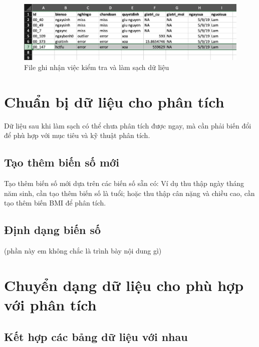 \documentclass[]{tufte-book}
\begin{document}
\begin{figure}

{\centering \includegraphics[width=0.8\linewidth]{figures/02_04} 

}

\caption[File ghi nhận việc kiểm tra và làm sạch dữ liệu]{File ghi nhận việc kiểm tra và làm sạch dữ liệu}\label{fig:documentclean}
\end{figure}

\hypertarget{chun-bi-d-liu-cho-phan-tich}{%
\chapter{Chuẩn bị dữ liệu cho phân tích}\label{chun-bi-d-liu-cho-phan-tich}}

Dữ liệu sau khi làm sạch có thể chưa phân tích được ngay, mà cần phải biến đổi để phù hợp với mục tiêu và kỹ thuật phân tích.

\hypertarget{tao-them-bin-s-mi}{%
\section{Tạo thêm biến số mới}\label{tao-them-bin-s-mi}}

Tạo thêm biến số mới dựa trên các biến số sẵn có: Ví dụ thu thập ngày tháng năm sinh, cần tạo thêm biến số là tuổi; hoặc thu thập cân nặng và chiều cao, cần tạo thêm biến BMI để phân tích.

\hypertarget{inh-dang-bin-s}{%
\section{Định dạng biến số}\label{inh-dang-bin-s}}

(phần này em không chắc là trình bày nội dung gì)

\hypertarget{chuyn-dang-d-liu-cho-phu-hp-vi-phan-tich}{%
\chapter{Chuyển dạng dữ liệu cho phù hợp với phân tích}\label{chuyn-dang-d-liu-cho-phu-hp-vi-phan-tich}}

\hypertarget{kt-hp-cac-bang-d-liu-vi-nhau}{%
\section{Kết hợp các bảng dữ liệu với nhau}\label{kt-hp-cac-bang-d-liu-vi-nhau}}
\end{document}
